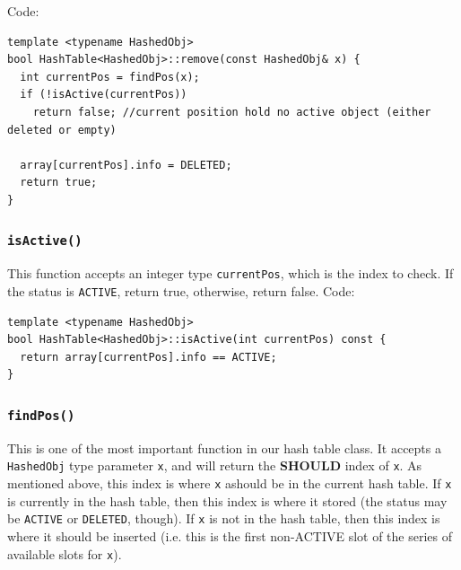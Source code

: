 \documentclass[12pt]{book}
\begin{document}
Code:
\begin{verbatim}
template <typename HashedObj>
bool HashTable<HashedObj>::remove(const HashedObj& x) {
  int currentPos = findPos(x);
  if (!isActive(currentPos))
    return false; //current position hold no active object (either deleted or empty)

  array[currentPos].info = DELETED;
  return true;
}
\end{verbatim}

\subsubsection{\texttt{isActive()}}
\label{sec:org4dfaea3}
This function accepts an integer type \texttt{currentPos}, which is the index to check. If the status is \texttt{ACTIVE}, return true, otherwise, return false. Code:
\begin{verbatim}
template <typename HashedObj>
bool HashTable<HashedObj>::isActive(int currentPos) const {
  return array[currentPos].info == ACTIVE;
}
\end{verbatim}

\subsubsection{\texttt{findPos()}}
\label{sec:org144941d}
This is one of the most important function in our hash table class. It accepts a \texttt{HashedObj} type parameter \texttt{x}, and will return the \textbf{SHOULD} index of \texttt{x}. As mentioned above, this index is where \texttt{x} ashould be in the current hash table. If \texttt{x} is currently in the hash table, then this index is where it stored (the status may be \texttt{ACTIVE} or \texttt{DELETED}, though). If \texttt{x} is not in the hash table, then this index is where it should be inserted (i.e. this is the first non-ACTIVE slot of the series of available slots for \texttt{x}).
\end{document}
